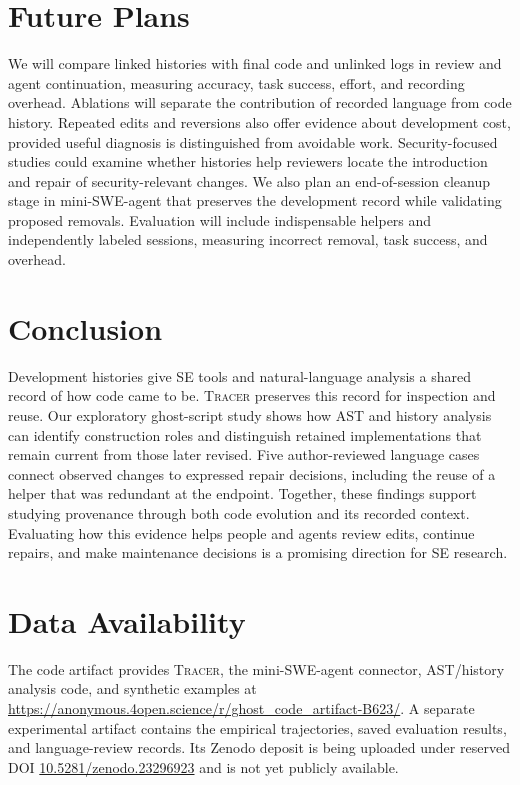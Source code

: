 \documentclass[10pt,conference]{IEEEtran}
\newcommand{\tracer}{\textsc{Tracer}}
\begin{document}
\section{Future Plans}
\label{sec:future}
We will compare linked histories with final code and unlinked logs in review and agent continuation, measuring accuracy, task success, effort, and recording overhead. Ablations will separate the contribution of recorded language from code history. Repeated edits and reversions also offer evidence about development cost, provided useful diagnosis is distinguished from avoidable work. Security-focused studies could examine whether histories help reviewers locate the introduction and repair of security-relevant changes. We also plan an end-of-session cleanup stage in mini-SWE-agent that preserves the development record while validating proposed removals. Evaluation will include indispensable helpers and independently labeled sessions, measuring incorrect removal, task success, and overhead.

\section{Conclusion}
Development histories give SE tools and natural-language analysis a shared record of how code came to be. \tracer{} preserves this record for inspection and reuse. Our exploratory ghost-script study shows how AST and history analysis can identify construction roles and distinguish retained implementations that remain current from those later revised. Five author-reviewed language cases connect observed changes to expressed repair decisions, including the reuse of a helper that was redundant at the endpoint. Together, these findings support studying provenance through both code evolution and its recorded context. Evaluating how this evidence helps people and agents review edits, continue repairs, and make maintenance decisions is a promising direction for SE research.

\section*{Data Availability}
\label{sec:data}
The code artifact provides \tracer{}, the mini-SWE-agent connector, AST/history analysis code, and synthetic examples at \url{https://anonymous.4open.science/r/ghost_code_artifact-B623/}. A separate experimental artifact contains the empirical trajectories, saved evaluation results, and language-review records. Its Zenodo deposit is being uploaded under reserved DOI \href{https://doi.org/10.5281/zenodo.23296923}{10.5281/zenodo.23296923} and is not yet publicly available.
\end{document}
